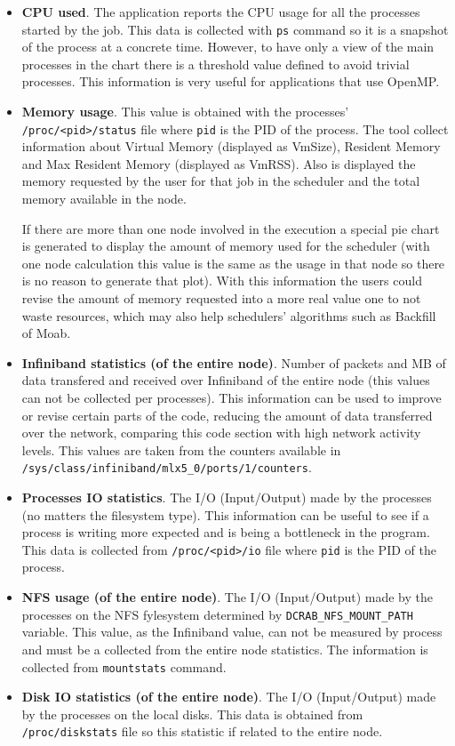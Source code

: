 \documentclass[10pt,a4paper]{report}
\begin{document}
\begin{itemize}
	\item \textbf{CPU used}. The application reports the CPU usage for all the processes started by the job. This data is collected with \verb+ps+ command so it is a snapshot of the process at a concrete time. However, to have only a view of the main processes in the chart there is a threshold value defined to avoid trivial processes. This information is very useful for applications that use OpenMP.
	\item \textbf{Memory usage}. This value is obtained with the processes' \verb+/proc/<pid>/status+ file where \verb+pid+ is the PID of the process. The tool collect information about Virtual Memory (displayed as VmSize), Resident Memory and Max Resident Memory (displayed as VmRSS). Also is displayed the memory requested by the user for that job in the scheduler and the total memory available in the node.

	If there are more than one node involved in the execution a special pie chart is generated to display the amount of memory used for the scheduler (with one node calculation this value is the same as the usage in that node so there is no reason to generate that plot). With this information the users could revise the amount of memory requested into a more real value one to not waste resources, which may also help schedulers' algorithms such as Backfill of Moab.
	\item \textbf{Infiniband statistics (of the entire node)}. Number of packets and MB of data transfered and received over Infiniband of the entire node (this values can not be collected per processes). This information can be used to improve or revise certain parts of the code, reducing the amount of data transferred over the network, comparing this code section with high network activity levels. This values are taken from the counters available in \verb+/sys/class/infiniband/mlx5_0/ports/1/counters+.
	\item \textbf{Processes IO statistics}. The I/O (Input/Output) made by the processes (no matters the filesystem type). This information can be useful to see if a process is writing more expected and is being a bottleneck in the program. This data is collected from \verb+/proc/<pid>/io+ file where \verb+pid+ is the PID of the process.
	\item \textbf{NFS usage (of the entire node)}. The I/O (Input/Output) made by the processes on the NFS fylesystem determined by \verb+DCRAB_NFS_MOUNT_PATH+ variable. This value, as the Infiniband value, can not be measured by process and must be a collected from the entire node statistics. The information is collected from \verb+mountstats+ command.
	\item \textbf{Disk IO statistics (of the entire node)}. The I/O (Input/Output) made by the processes on the local disks. This data is obtained from \verb+/proc/diskstats+ file so this statistic if related to the entire node.
\end{itemize}
\end{document}
